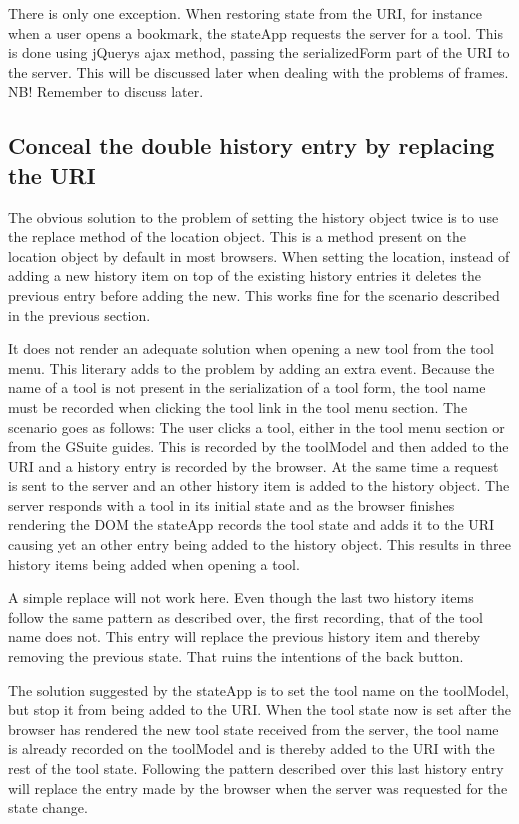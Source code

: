 \documentclass[english]{ifimaster}
\begin{document}
There is only one exception. When restoring state from the URI, for instance when a user opens a bookmark, the stateApp requests the server for a tool. This is done using jQuerys ajax method, passing the serializedForm part of the URI to the server. This will be discussed later when dealing with the problems of frames. NB! Remember to discuss later.

\subsection{Conceal the double history entry by replacing the URI}
The obvious solution to the problem of setting the history object twice is to use the replace method of the location object. This is a method present on the location object by default in most browsers. When setting the location, instead of adding a new history item on top of the existing history entries it deletes the previous entry before adding the new. This works fine for the scenario described in the previous section.  

It does not render an adequate solution when opening a new tool from the tool menu. This literary adds to the problem by adding an extra event. Because the name of a tool is not present in the serialization of a tool form, the tool name must be recorded when clicking the tool link in the tool menu section. The scenario goes as follows: The user clicks a tool, either in the tool menu section or from the GSuite guides. This is recorded by the toolModel and then added to the URI and a history entry is recorded by the browser. At the same time a request is sent to the server and an other history item is added to the history object. The server responds with a tool in its initial state and as the browser finishes rendering the DOM the stateApp records the tool state and adds it to the URI causing yet an other entry being added to the history object. This results in three history items being added when opening a tool. 

A simple replace will not work here. Even though the last two history items follow the same pattern as described over, the first recording, that of the tool name does not. This entry will replace the previous history item and thereby removing the previous state. That ruins the intentions of the back button. 

The solution suggested by the stateApp is to set the tool name on the toolModel, but stop it from being added to the URI. When the tool state now is set after the browser has rendered the new tool state received from the server, the tool name is already recorded on the toolModel and is thereby added to the URI with the rest of the tool state. Following the pattern described over this last history entry will replace the entry made by the browser when the server was requested for the state change. 
\end{document}
